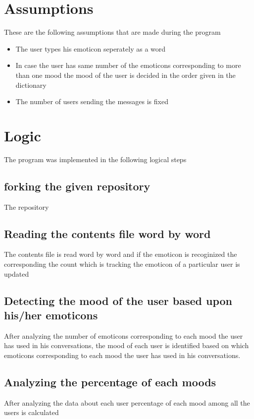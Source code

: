 \documentclass[a4paper,10pt]{article}
\begin{document}
\section{Assumptions}
These are the following assumptions that are made during the program
\begin{itemize}
 \item The user types his emoticon seperately as a word
 \item In case the user has same number of the emoticons corresponding to more than one mood the mood of the user is decided in the order given in the dictionary
 \item The number of users sending the messages is fixed
\end{itemize}

\pagebreak

\section{Logic}
The program was implemented in the following logical steps
\subsection{forking the given repository}
The repository
\subsection{Reading the contents file word by word}
The contents file is read word by word and if the emoticon is recoginized the corresponding the count which is tracking the emoticon of a particular user is updated
\subsection{Detecting the mood of the user based upon his/her emoticons}
After analyzing the number of emoticons corresponding to each mood the user has used in his conversations, the mood of each user is identified based on which emoticons corresponding to each mood the user has used in his conversations.
\subsection{Analyzing the percentage of each moods}
After analyzing the data about each user percentage of each mood among all the users is calculated
\pagebreak
\pagebreak
\end{document}
